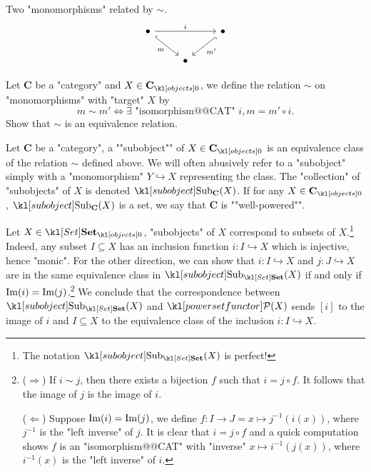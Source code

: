 \documentclass[main.tex]{subfiles}
\begin{document}
\begin{exer}\label{exer:duality:equivsubobj}
	\begin{marginfigure}[1\baselineskip]
		Two "monomorphisms" related by $\sim$.
		\begin{equation*}
			\begin{tikzcd}
				\bullet && \bullet \\
				& \bullet
				\arrow["m"', hook, from=1-1, to=2-2]
				\arrow["{m'}", hook, from=1-3, to=2-2]
				\arrow["i", from=1-1, to=1-3]
			\end{tikzcd}
		\end{equation*}
	\end{marginfigure}
	Let $\mathbf{C}$ be a "category" and $X \in \obj{\mathbf{C}}$, we define the relation $\sim$ on "monomorphisms" with "target" $X$ by \[m \sim m' \Leftrightarrow \exists \text{ "isomorphism@@CAT" } i,  m = m' \circ i.\]
	Show that $\sim$ is an equivalence relation.
\end{exer}
\begin{defn}[Subobject]
	\AP Let $\mathbf{C}$ be a "category", a ""subobject"" of $X \in \obj{\mathbf{C}}$ is an equivalence class of the relation $\sim$ defined above. We will often abusively refer to a "subobject" simply with a "monomorphism" $Y \hookrightarrow X$ representing the class. The "collection" of "subobjects" of $X$ is denoted $\Sub_{\mathbf{C}}(X)$. \AP If for any $X \in \obj{\mathbf{C}}$, $\Sub_{\mathbf{C}}(X)$ is a set, we say that $\mathbf{C}$ is ""well-powered"".
\end{defn}
\begin{exmp}[$\catSet$]\label{exmp:subobjsubset}
	Let $X \in \obj{\catSet}$, "subobjects" of $X$ correspond to subsets of $X$.\footnote{The notation $\Sub_{\catSet}(X)$ is perfect!} Indeed, any subset $I \subseteq X$ has an inclusion function $i: I \hookrightarrow X$ which is injective, hence "monic". For the other direction, we can show that $i:I \hookrightarrow X$ and $j: J \hookrightarrow X$ are in the same equivalence class in $\Sub_{\catSet}(X)$ if and only if $\operatorname{Im}(i) = \operatorname{Im}(j)$.\footnote{($\Rightarrow$) If $i \sim j$, then there exists a bijection $f$ such that $i = j \circ f$. It follows that the image of $j$ is the image of $i$.
	
	($\Leftarrow$) Suppose $\operatorname{Im}(i)=\operatorname{Im}(j)$, we define $f:I \rightarrow J = x \mapsto j^{-1}(i(x))$, where $j^{-1}$ is the "left inverse" of $j$. It is clear that $i = j \circ f$ and a quick computation shows $f$ is an "isomorphism@@CAT" with "inverse" $x\mapsto i^{-1}(j(x))$, where $i^{-1}(x)$ is the "left inverse" of $i$.} We conclude that the correspondence between $\Sub_{\catSet}(X)$ and $\mPcov(X)$ sends $[i]$ to the image of $i$ and $I\subseteq X$ to the equivalence class of the inclusion $i: I \hookrightarrow X$.
\end{exmp}
\end{document}
